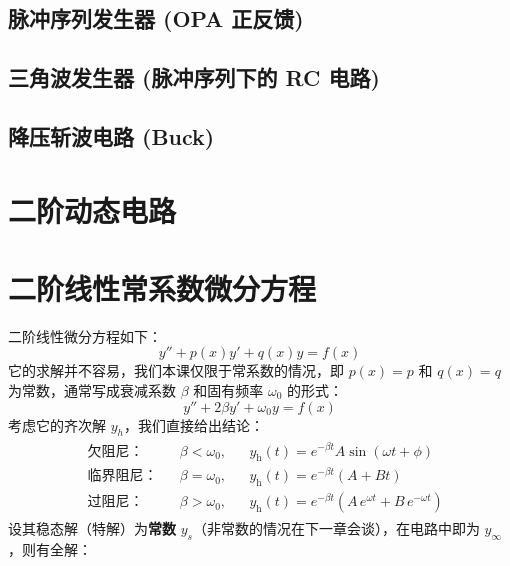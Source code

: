 \documentclass[UTF8]{report}
\theoremstyle{MyLineTheoremStyle} %
\theoremstyle{MyBlockTheoremStyle} %
\theoremstyle{MySubsubsectionStyle} %
\begin{document}
\subsection{脉冲序列发生器 (OPA 正反馈)}
\subsection{三角波发生器 (脉冲序列下的 RC 电路)}
\subsection{降压斩波电路 (Buck)}

\section{二阶动态电路}
\section{二阶线性常系数微分方程}
二阶线性微分方程如下：
\begin{equation}
y'' + p(x)y' + q(x)y = f(x)
\end{equation}
它的求解并不容易，我们本课仅限于常系数的情况，即 $p(x) = p$ 和 $q(x) = q$ 为常数，通常写成衰减系数 $\beta$ 和固有频率 $\omega_0$ 的形式：
\begin{equation}
y'' + 2\beta y' + \omega_0 y = f(x)
\end{equation}
考虑它的齐次解 $y_h$，我们直接给出结论：
\begin{gather}
\begin{aligned}
    &\text{欠阻尼：} &&\beta < \omega_0, &&y_\text{h}(t) = e^{-\beta t} A\sin \left( \omega t + \phi \right) \\ 
    &\text{临界阻尼：} &&\beta = \omega_0, &&y_\text{h}(t) = e^{-\beta t} (A + Bt) \\
    &\text{过阻尼：} &&\beta > \omega_0, &&y_\text{h}(t) = e^{-\beta t}\left( A\,e^{\omega t} + B\,e^{-\omega t}\right)
\end{aligned}
\end{gather}
设其稳态解（特解）为\textbf{常数} $y_s$（非常数的情况在下一章会谈），在电路中即为 $y_\infty$，则有全解：
\end{document}
